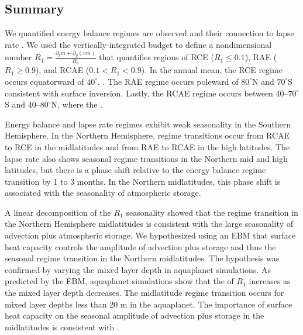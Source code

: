 \documentclass{ametsocV5}
\begin{document}
\subsection{Summary}
We quantified  energy balance regimes are observed and their connection to lapse rate . We used the vertically-integrated  budget to define a nondimensional number $R_1=\frac{\partial_t m + \partial_y (vm)}{R_a}$ that quantifies regions of RCE ($R_1\le0.1$), RAE ($R_1\ge0.9$), and RCAE ($0.1<R_1<0.9$). In the annual mean, the RCE regime occurs equatorward of $40^\circ$, . The RAE regime occurs poleward of $80^\circ$N and $70^\circ$S consistent with  surface inversion. Lastly, the RCAE regime occurs between $40$--$70^\circ$S and $40$--$80^\circ$N, where the .

Energy balance and lapse rate regimes exhibit weak seasonality in the Southern Hemisphere. In the Northern Hemisphere, regime transitions occur from RCAE to RCE in the midlatitudes and from RAE to RCAE in the high latitudes. The lapse rate also shows seasonal regime transitions in the Northern mid and high latitudes, but there is a phase shift relative to the energy balance regime transition by 1 to 3 months. In the Northern midlatitudes, this phase shift is associated with the seasonality of atmospheric storage.

A linear decomposition of the $R_1$ seasonality showed that the regime transition in the Northern Hemisphere midlatitudes is consistent with the large seasonality of advection plus atmospheric storage. We hypothesized using an EBM that surface heat capacity controls the amplitude of advection plus storage and thus the seasonal regime transition in the Northern midlatitudes. The hypothesis was confirmed by varying the mixed layer depth in aquaplanet simulations. As predicted by the EBM, aquaplanet simulations show that the  of $R_1$ increases as the mixed layer depth decreases. The midlatitude regime transition occurs for mixed layer depths less than 20 m in the aquaplanet. The importance of surface heat capacity on the seasonal amplitude of advection plus storage in the midlatitudes is consistent with \cite{barpanda2020}.
\end{document}
